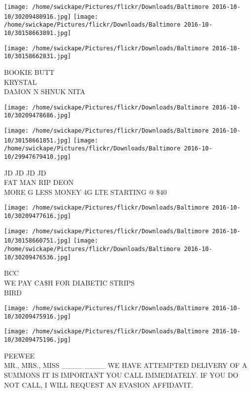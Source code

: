 \documentclass[10pt,letterpaper]{article}
\begin{document}
\texttt{[image: /home/swickape/Pictures/flickr/Downloads/Baltimore 2016-10-10/30209480916.jpg]}
\texttt{[image: /home/swickape/Pictures/flickr/Downloads/Baltimore 2016-10-10/30158663891.jpg]}

\vspace{0.25in}
\texttt{[image: /home/swickape/Pictures/flickr/Downloads/Baltimore 2016-10-10/30158662831.jpg]}

BOOKIE BUTT\\
KRYSTAL\\
DAMON N SHNUK NITA\\
\pagebreak

\texttt{[image: /home/swickape/Pictures/flickr/Downloads/Baltimore 2016-10-10/30209478686.jpg]}

\vspace{0.25in}
\texttt{[image: /home/swickape/Pictures/flickr/Downloads/Baltimore 2016-10-10/30158661851.jpg]}
\texttt{[image: /home/swickape/Pictures/flickr/Downloads/Baltimore 2016-10-10/29947679410.jpg]}

JD JD JD JD\\
FAT MAN RIP DEON\\
MORE G LESS MONEY 4G LTE STARTING @ \$40\\
\pagebreak

\texttt{[image: /home/swickape/Pictures/flickr/Downloads/Baltimore 2016-10-10/30209477616.jpg]}

\vspace{0.25in}
\texttt{[image: /home/swickape/Pictures/flickr/Downloads/Baltimore 2016-10-10/30158660751.jpg]}
\texttt{[image: /home/swickape/Pictures/flickr/Downloads/Baltimore 2016-10-10/30209476536.jpg]}

BCC\\
WE PAY CA\$H FOR DIABETIC STRIPS\\
BIRD\\
\pagebreak

\texttt{[image: /home/swickape/Pictures/flickr/Downloads/Baltimore 2016-10-10/30209475916.jpg]}

\vspace{0.25in}
\texttt{[image: /home/swickape/Pictures/flickr/Downloads/Baltimore 2016-10-10/30209475196.jpg]}

PEEWEE\\
MR., MRS., MISS \_\_\_\_ \_\_\_\_ WE HAVE ATTEMPTED DELIVERY OF A SUMMONS IT IS IMPORTANT YOU CALL IMMEDIATELY.  IF YOU DO NOT CALL, I WILL REQUEST AN EVASION AFFIDAVIT.\\
\pagebreak
\end{document}
